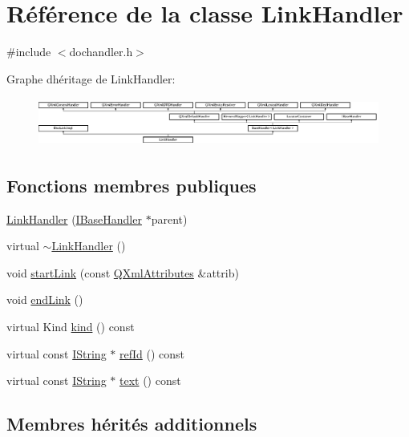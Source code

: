 \hypertarget{class_link_handler}{}\section{Référence de la classe Link\+Handler}
\label{class_link_handler}


{\ttfamily \#include $<$dochandler.\+h$>$}

Graphe d\textquotesingle{}héritage de Link\+Handler\+:\begin{figure}[H]
\begin{center}
\leavevmode
\includegraphics[height=1.600000cm]{class_link_handler}
\end{center}
\end{figure}
\subsection*{Fonctions membres publiques}
\begin{DoxyCompactItemize}
\item 
\hyperlink{class_link_handler_ab840f56fe3544cff880191770eafa8ea}{Link\+Handler} (\hyperlink{class_i_base_handler}{I\+Base\+Handler} $\ast$parent)
\item 
virtual \hyperlink{class_link_handler_a68ca819fe9ac32bba3595eea664eb1c6}{$\sim$\+Link\+Handler} ()
\item 
void \hyperlink{class_link_handler_a168e6fb1834fe465c2b419aef08d7fc0}{start\+Link} (const \hyperlink{class_q_xml_attributes}{Q\+Xml\+Attributes} \&attrib)
\item 
void \hyperlink{class_link_handler_a04d018a5461eae27af1776b451fa15cb}{end\+Link} ()
\item 
virtual Kind \hyperlink{class_link_handler_a8251d940213b39519408c6f2dc9dc9cf}{kind} () const 
\item 
virtual const \hyperlink{class_i_string}{I\+String} $\ast$ \hyperlink{class_link_handler_a48e7f2d4d02996908d98a093a25ce453}{ref\+Id} () const 
\item 
virtual const \hyperlink{class_i_string}{I\+String} $\ast$ \hyperlink{class_link_handler_ab1b4fea393aad98af6cb67d938e967fc}{text} () const 
\end{DoxyCompactItemize}
\subsection*{Membres hérités additionnels}


